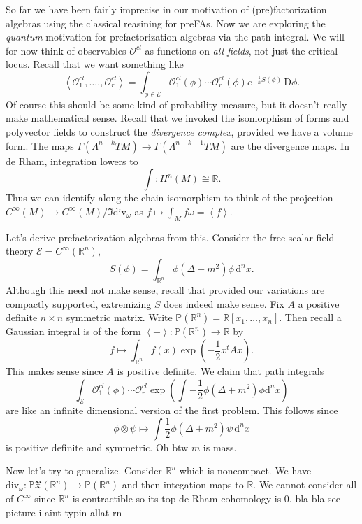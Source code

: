 
So far we have been fairly imprecise in our motivation of (pre)factorization algebras using the classical reasining for preFAs. Now we are exploring the \emph{quantum} motivation for prefactorization algebras via the path integral. We will for now think of observables $\mathcal{O} ^{cl} $ as functions on \emph{all fields}, not just the critical locus. Recall that we want something like
\[
	\left\langle \mathcal{O} _1^{cl} , \ldots ., \mathcal{O} ^{cl} _r \right\rangle =\int _{\phi \in \mathcal{E} } \mathcal{O}^{cl}_1(\phi )\cdots \mathcal{O}^{cl} _r(\phi )e^{-\frac{1}{\hbar }S(\phi )}  \,\mathrm{D}\phi  
.\]
Of course this should be some kind of probability measure, but it doesn't really make mathematical sense. Recall that we invoked the isomorphism of forms and polyvector fields to construct the \emph{divergence complex}, provided we have a volume form. The maps $\Gamma (\Lambda ^{n-k} TM)\to \Gamma (\Lambda ^{n-k-1} TM)$ are the divergence maps. In de Rham, integration lowers to
\[
	\int : H^n(M)\cong  \mathbb{R} 
.\]
Thus we can identify along the chain isomorphism to think of the projection $C^\infty (M)\to C^\infty (M) / \Im \mathrm{div} _\omega $ as $f\mapsto \int _Mf\omega =\left\langle f \right\rangle $.

Let's derive prefactorization algebras from this. Consider the free scalar field theory $\mathcal{E} =C^\infty (\mathbb{R} ^n)$,
\[
	S(\phi )=\int_{\mathbb{R} ^n} \phi (\Delta +m^2)\phi  \,\mathrm{d} ^nx
.\]
Although this need not make sense, recall that provided our variations are compactly supported, extremizing $S$ does indeed make sense. Fix $A$ a positive definite $n\times n$ symmetric matrix. Write $\mathbb{P} (\mathbb{R} ^n)=\mathbb{R} [x_1, \ldots ,x_n]$. Then recall a Gaussian integral is of the form $\left\langle - \right\rangle : \mathbb{P} (\mathbb{R} ^n) \to \mathbb{R} $ by
\[
	f\mapsto \int_{\mathbb{R} ^n} f(x) \exp \left( -\frac{1}{2} x^tAx \right)
.\]
This makes sense since $A$ is positive definite. We claim that path integrals
\[
	\int_\mathcal{E} \mathcal{O} _1^{cl} (\phi )\cdots \mathcal{O} _r^{cl} \exp \left(\int -\frac{1}{2} \phi (\Delta +m^2) \phi \mathrm{d} ^nx\right)
\]
are like an infinite dimensional version of the first problem. This follows since
\[
	\phi \otimes \psi \mapsto \int \frac{1}{2} \phi (\Delta +m^2)\psi  \,\mathrm{d} ^nx
\]
is positive definite and symmetric. Oh btw $m$ is mass.

Now let's try to generalize. Consider $\mathbb{R} ^n$ which is noncompact. We have $\mathrm{div} _\omega : \mathbb{P} \mathfrak{X} (\mathbb{R} ^n) \to \mathbb{P} (\mathbb{R} ^n)$ and then integation maps to $\mathbb{R} $. We cannot consider all of $C^\infty $ since $\mathbb{R} ^n$ is contractible so its top de Rham cohomology is 0. bla bla see picture i aint typin allat rn

